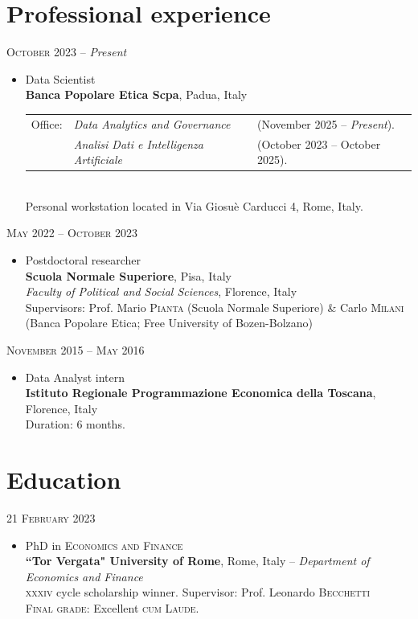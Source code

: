 \documentclass{article}
\begin{document}
\section*{Professional experience}
\textsc{October} 2023 -- \emph{Present}
\begin{itemize}
	\item Data Scientist\\
	 \textbf{Banca Popolare Etica Scpa}, Padua, Italy\\
	\noindent\begin{tabularx}{.85\textwidth}{@{}l X@{} @{}X@{}}
 		 Office: & \textit{Data Analytics and Governance}\dotfill&\footnotesize{(November 2025 -- \emph{Present})}.\\
			& \textit{Analisi Dati e Intelligenza Artificiale}\dotfill&\footnotesize{(October 2023 -- October 2025)}.
 	\end{tabularx}\\
  Personal workstation located in Via Giosu\`{e} Carducci 4, Rome, Italy.
\end{itemize}
\textsc{May} 2022 -- \textsc{October} 2023
\begin{itemize}
	\item Postdoctoral researcher\\
	 \textbf{Scuola Normale Superiore}, Pisa, Italy\\ 
	  \textit{Faculty of Political and Social Sciences}, Florence, Italy\\
	  Supervisors: Prof. Mario \textsc{Pianta} (Scuola Normale Superiore) \& Carlo \textsc{Milani} (Banca Popolare Etica; Free University of Bozen-Bolzano)
\end{itemize}
\textsc{November} 2015 -- \textsc{May} 2016
\begin{itemize}
	\item Data Analyst intern\\
 \textbf{Istituto Regionale Programmazione Economica della Toscana}, Florence, Italy\\
 Duration: 6 months.
\end{itemize}
\section*{Education}

21 \textsc{February} 2023

\begin{itemize}
	\item PhD in \textsc{Economics and Finance}\\
	 \textbf{``Tor Vergata" University of Rome}, Rome, Italy --  \textit{Department of Economics and Finance}\\
	  \textsc{xxxiv} cycle scholarship winner. %
	  Supervisor: Prof. Leonardo \textsc{Becchetti}\\
   \textsc{Final grade}: Excellent \small{\textsc{cum Laude}}.
\end{itemize}
\end{document}
